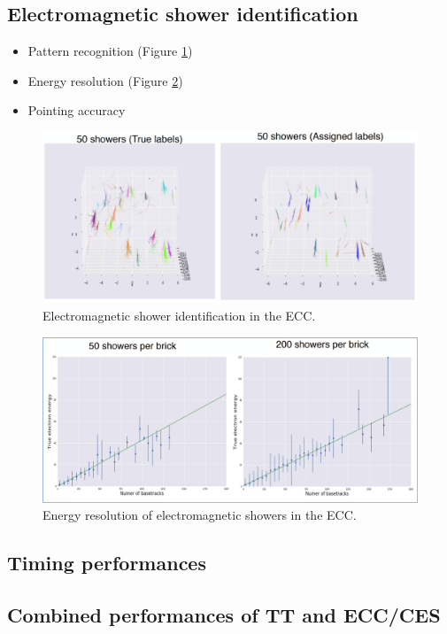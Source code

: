 \subsection{Electromagnetic shower identification}
\begin{itemize}
    \item Pattern recognition (Figure \ref{fig:shower_id})
    \item Energy resolution (Figure \ref{fig:shower_res})
    \item Pointing accuracy 
\end{itemize}

\begin{figure}[htbp]
\centering
\includegraphics[scale=0.6]{figs/ScatteringSpectrometer/Showers.png}
\caption{Electromagnetic shower identification in the ECC.}
\label{fig:shower_id}
\end{figure}

\begin{figure}[htbp]
\centering
\includegraphics[scale=0.5]{figs/ScatteringSpectrometer/ShowersRes.png}
\caption{Energy resolution of electromagnetic showers in the ECC.}
\label{fig:shower_res}
\end{figure}

\subsection{Timing performances}

\subsection{Combined performances of TT and ECC/CES}
